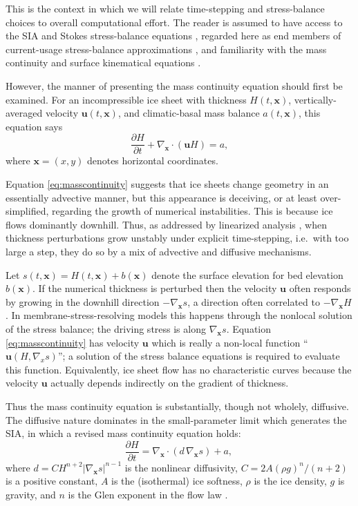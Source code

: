 \documentclass[twocolumn,letterpaper]{igs}
\newcommand\bu{\mathbf{u}}
\newcommand\bx{\mathbf{x}}
\newcommand{\grad}{\nabla}
\newcommand{\Divx}{\nabla_\bx \cdot}
\newcommand{\gradx}{\nabla_\bx}
\begin{document}
This is the context in which we will relate time-stepping and stress-balance choices to overall computational effort.  The reader is assumed to have access to the SIA and Stokes stress-balance equations \citep{GreveBlatter2009,SchoofHewitt2013}, regarded here as end members of current-usage stress-balance approximations \citep{Robinsonetal2022}, and familiarity with the mass continuity and surface kinematical equations \citep{GreveBlatter2009}.

However, the manner of presenting the mass continuity equation should first be examined.  For an incompressible ice sheet with thickness $H(t,\bx)$, vertically-averaged velocity $\bu(t,\bx)$, and climatic-basal mass balance $a(t,\bx)$, this equation says
\begin{equation}
\frac{\partial H}{\partial t} + \Divx \left(\bu H\right) = a, \label{eq:masscontinuity}
\end{equation}
where $\bx=(x,y)$ denotes horizontal coordinates.

Equation \eqref{eq:masscontinuity} suggests that ice sheets change geometry in an essentially advective manner, but this appearance is deceiving, or at least over-simplified, regarding the growth of numerical instabilities.  This is because ice flows dominantly downhill.  Thus, as addressed by linearized analysis \citep{Chengetal2017,Robinsonetal2022}, when thickness perturbations grow unstably under explicit time-stepping, i.e.~with too large a step, they do so by a mix of advective and diffusive mechanisms.

Let $s(t,\bx)=H(t,\bx)+b(\bx)$ denote the surface elevation for bed elevation $b(\bx)$.  If the numerical thickness is perturbed then the velocity $\bu$ often responds by growing in the downhill direction $-\gradx s$, a direction often correlated to $-\gradx H$.  In membrane-stress-resolving models this happens through the nonlocal solution of the stress balance; the driving stress is along $\gradx s$.  Equation \eqref{eq:masscontinuity} has velocity $\bu$ which is really a non-local function ``$\bu(H,\grad_x s)$''; a solution of the stress balance equations is required to evaluate this function.  Equivalently, ice sheet flow has no characteristic curves because the velocity $\bu$ actually depends indirectly on the gradient of thickness.

Thus the mass continuity equation is substantially, though not wholely, diffusive.  The diffusive nature dominates in the small-parameter limit which generates the SIA, in which a revised mass continuity equation holds:
\begin{equation}
\frac{\partial H}{\partial t} = \Divx \left(d\, \gradx s \right) + a, \,  \label{eq:siamasscontinuity}
\end{equation}
where $d = C H^{n+2} |\gradx s|^{n-1}$ is the nonlinear diffusivity, $C = 2 A (\rho g)^n/(n+2)$ is a positive constant, $A$ is the (isothermal) ice softness, $\rho$ is the ice density, $g$ is gravity, and $n$ is the Glen exponent in the flow law \citep{GreveBlatter2009}.
\end{document}
